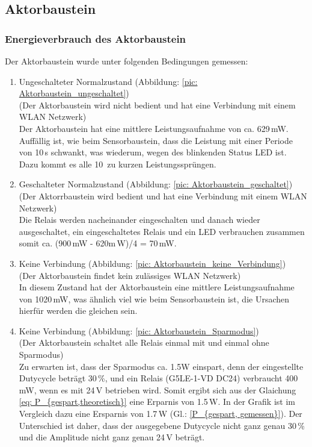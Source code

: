 \subsection{Aktorbaustein} \label{energie_aktorbaustein}
\subsubsection{Energieverbrauch des Aktorbaustein}
Der Aktorbaustein wurde unter folgenden Bedingungen gemessen:

\begin{enumerate}
	\item Ungeschalteter Normalzustand (Abbildung: \ref{pic: Aktorbaustein_ungeschaltet}) \\(Der Aktorbaustein wird nicht bedient und hat eine Verbindung mit einem WLAN Netzwerk) \\
	Der Aktorbaustein hat eine mittlere Leistungsaufnahme von ca. 629\,mW. Auffällig ist, wie beim Sensorbaustein, dass die Leistung mit einer Periode von 10\,s schwankt, was wiederum, wegen des blinkenden Status LED ist. Dazu kommt es alle 10\, zu kurzen Leistungssprüngen.
	\\
	\item Geschalteter Normalzustand (Abbildung: \ref{pic: Aktorbaustein_geschaltet})\\ (Der Aktorrbaustein wird bedient und hat eine Verbindung mit einem WLAN Netzwerk)\\
	Die Relais werden nacheinander eingeschalten und danach wieder ausgeschaltet, ein eingeschaltetes Relais und ein LED verbrauchen zusammen somit ca. (900\,mW - 620m\,W)/4 = 70\,mW.
	\\
	\item Keine Verbindung (Abbildung: \ref{pic: Aktorbaustein_keine_Verbindung})\\ (Der Aktorbaustein findet kein zulässiges WLAN Netzwerk)\\
	In diesem Zustand hat der Aktorbaustein eine mittlere Leistungsaufnahme von 1020\,mW, was ähnlich viel wie beim Sensorbaustein ist, die Ursachen hierfür werden die gleichen sein.
	\\
	\item Keine Verbindung (Abbildung: \ref{pic: Aktorbaustein_Sparmodus})\\ (Der Aktorbaustein schaltet alle Relais einmal mit und einmal ohne Sparmodus)\\
	Zu erwarten ist, dass der Sparmodus ca. 1.5W einspart, denn der eingestellte Dutycycle beträgt 30\,\%, und ein Relais (G5LE-1-VD DC24) verbraucht 400\,mW, wenn es mit 24\,V betrieben wird. Somit ergibt sich aus der Glaichung \ref{eq: P_{gespart,theoretisch}} eine Erparnis von 1.5\,W. In der Grafik ist im Vergleich dazu eine Ersparnis von 1.7\,W (Gl.:  \ref{P_{gespart, gemessen}}). Der Unterschied ist daher, dass der ausgegebene Dutycycle nicht ganz genau 30\,\% und die Amplitude nicht ganz genau 24\,V beträgt.
\end{enumerate}

